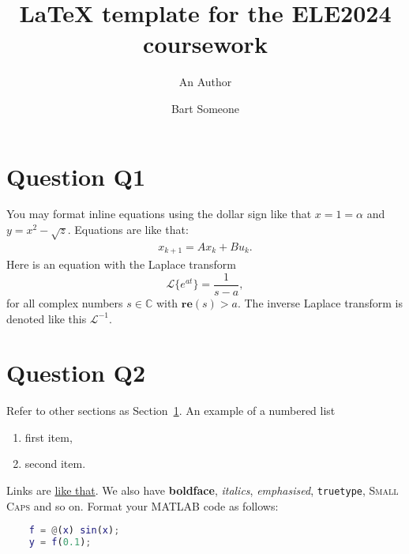 \documentclass[a4paper,10pt,reqno]{amsart}
\title[ELE2024 Coursework]{LaTeX template for the ELE2024 coursework}
\author[A. Author]{An Author}
\author[B. Someone]{Bart Someone}
\numberwithin{equation}{section}
\renewcommand{\Re}{\mathbf{re}}
\newcommand{\C}{\mathbb{C}}
\newcommand{\lap}{\mathscr{L}}
\begin{document}
\maketitle


\section{Question Q1}\label{sec:q1}
  You may format inline equations using the dollar sign like that $x = 1 = \alpha$ and $y = x^2 - \sqrt{z}$. Equations are like that:
  \begin{align}
    \label{eq:lti_state_update}
    x_{k+1} = A x_k + Bu_k.
  \end{align}
  Here is an equation with the Laplace transform
  \begin{equation}
    \lap \{e^{at}\} = \frac{1}{s-a},
  \end{equation}
  for all complex numbers $s\in\C$ with $\Re(s)>a$. The inverse Laplace transform is denoted like this $\lap^{-1}$.




\section{Question Q2}
  Refer to other sections as Section~\ref{sec:q1}. An example of a numbered list
  \begin{enumerate}
    \item first item,
    \item second item.
  \end{enumerate}
  Links are \href{https://google.com}{like that}. We also have \textbf{boldface}, \textit{italics},
  \emph{emphasised}, \texttt{truetype}, \textsc{Small Caps} and so on.
  Format your MATLAB code as follows:
  \begin{lstlisting}[language=matlab]
    % My code:
    f = @(x) sin(x);
    y = f(0.1);
  \end{lstlisting}
\end{document}
